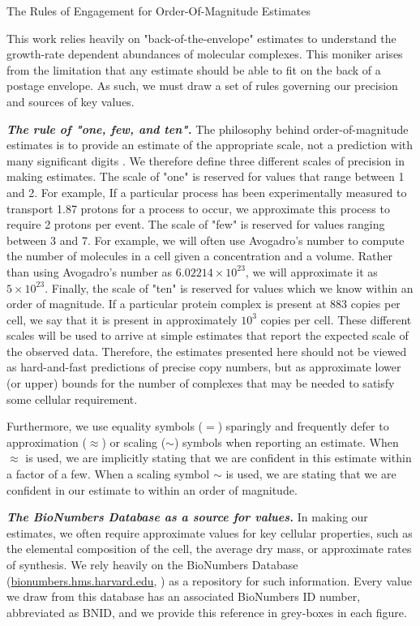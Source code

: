 \begin{featurebox}
\caption{The Rules of Engagement for Order-Of-Magnitude Estimates}
This work relies heavily on "back-of-the-envelope" estimates to understand
the growth-rate dependent abundances of molecular complexes. This moniker
arises from the limitation that any estimate should be able to fit on the
back of a postage envelope. As such, we must draw a set of rules governing
our precision and sources of key values.

\textbf{\itshape The rule of "one, few, and ten".} The philosophy behind
order-of-magnitude estimates is to provide an estimate of the appropriate scale,
not a prediction with many significant digits \citep{mahajan2010}. We therefore define three different
scales of precision in making estimates. The scale of "one" is reserved for
values that range between 1 and 2. For example, If a particular process has been
experimentally measured to transport 1.87 protons for a process to occur, we approximate
this process to require 2 protons per event. The scale of "few" is reserved for
values ranging between 3 and 7. For example, we will often use Avogadro's number
to compute the number of molecules in a cell given a concentration and a volume.
Rather than using Avogadro's number as $6.02214 \times 10^{23}$, we will
approximate it as $5 \times 10^{23}$. Finally, the scale of "ten" is reserved
for values which we know within an order of magnitude. If a particular protein
complex is present at 883 copies per cell, we say that it is present in
approximately $10^3$ copies per cell. These different scales will be used
to arrive at simple estimates that report the expected scale of the
observed data. Therefore, the estimates  presented here should not be viewed as
hard-and-fast predictions of precise copy numbers, but as approximate lower (or upper)
bounds for the number of complexes that may be needed to satisfy some cellular requirement.

Furthermore, we use equality symbols ($=$) sparingly and frequently defer to
approximation ($\approx$) or scaling ($\sim$) symbols when reporting an
estimate. When $\approx$ is used, we are implicitly stating that
we are confident in this estimate within a factor of a few. When a scaling
symbol $\sim$ is used, we are stating that we are confident in our estimate to
within an order of magnitude.

\textbf{\itshape The BioNumbers Database as a source for values.} In making our
estimates, we often require approximate values for key cellular properties, such
as the elemental composition of the cell, the average dry mass, or approximate
rates of synthesis. We rely heavily on the BioNumbers Database
(\href{https://bionumbers.hms.harvard.edu}{bionumbers.hms.harvard.edu},
\cite{milo2010}) as a repository for such information. Every value we draw from this database has
an associated BioNumbers ID number, abbreviated as BNID, and we provide this
reference in grey-boxes in each  figure.


\end{featurebox}
